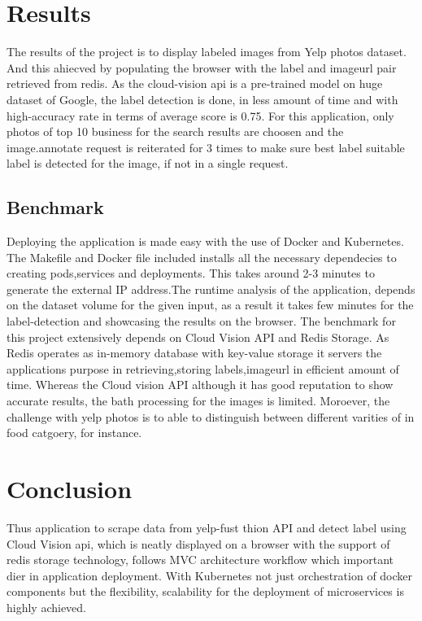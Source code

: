 \section{Results}

The results of the project is to display labeled images from Yelp
photos dataset. And this ahiecved by populating the browser with the
label and imageurl pair retrieved from redis. As the cloud-vision api
is a pre-trained model on huge dataset of Google, the label detection
is done, in less amount of time and with high-accuracy rate in terms
of average score is 0.75. For this application, only photos of top 10
business for the search results are choosen and the image.annotate
request is reiterated for 3 times to make sure best label suitable
label is detected for the image, if not in a single request.

\subsection{Benchmark}

Deploying the application is made easy with the use of Docker and
Kubernetes.  The Makefile and Docker file included installs all the
necessary dependecies to creating pods,services and deployments. This
takes around 2-3 minutes to generate the external IP address.The
runtime analysis of the application, depends on the dataset volume for
the given input, as a result it takes few minutes for the
label-detection and showcasing the results on the browser. The
benchmark for this project extensively depends on Cloud Vision API and
Redis Storage. As Redis operates as in-memory database with key-value
storage it servers the applications purpose in retrieving,storing
labels,imageurl in efficient amount of time. Whereas the Cloud vision
API although it has good reputation to show accurate results, the bath
processing for the images is limited. Moroever, the challenge with
yelp photos is to able to distinguish between different varities of in
food catgoery, for instance.

\section{Conclusion}

Thus application to scrape data from yelp-fust thion API and detect label
using Cloud Vision api, which is neatly displayed on a browser with
the support of redis storage technology, follows MVC architecture
workflow which important dier in application deployment. With
Kubernetes not just orchestration of docker components but the
flexibility, scalability for the deployment of microservices is highly
achieved.
  
